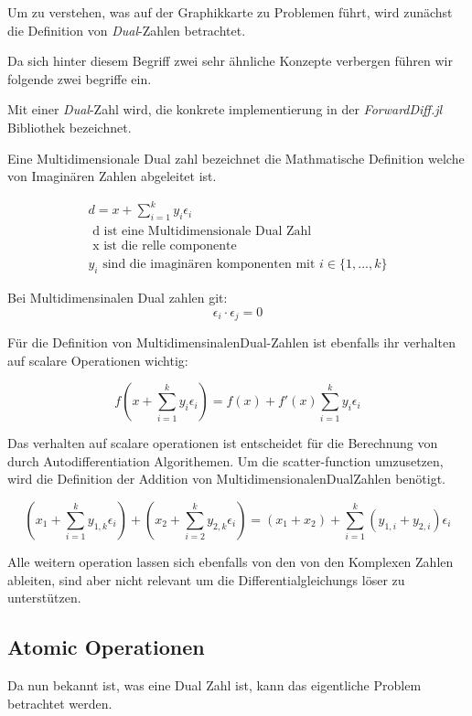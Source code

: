 Um zu verstehen, was auf der Graphikkarte zu Problemen führt, wird zunächst die Definition von \textit{Dual}-Zahlen betrachtet.

Da sich hinter diesem Begriff zwei sehr ähnliche Konzepte verbergen führen wir folgende zwei begriffe ein.

Mit einer \textit{Dual}-Zahl wird, die konkrete implementierung in der \textit{ForwardDiff.jl} Bibliothek bezeichnet.

Eine Multidimensionale Dual zahl bezeichnet die Mathmatische Definition welche von Imaginären Zahlen abgeleitet ist.

\begin{gather*}
 d = x + \sum_{i = 1}^{k} y_i \epsilon_i \\
	\text{ d ist eine Multidimensionale Dual Zahl } \\
	\text{ x ist die relle componente } \\
	y_i \text{ sind die imaginären komponenten mit } i \in \{1, ..., k\}
\end{gather*}

Bei Multidimensinalen Dual zahlen git:
$$
 \epsilon_i \cdot \epsilon_j = 0
$$

Für die Definition von MultidimensinalenDual-Zahlen ist ebenfalls ihr verhalten auf scalare Operationen wichtig:

$$
 f( x + \sum_{i = 1}^{k} y_i \epsilon_i  ) = f(x) +  f'(x) \sum_{i = 1}^{k} y_i \epsilon_i
$$
\cite{juliaForwardDiffPackage}


Das verhalten auf scalare operationen ist entscheidet für die Berechnung von durch Autodifferentiation Algorithemen.
Um die scatter-function umzusetzen, wird die Definition der Addition von MultidimensionalenDualZahlen \cite{RecentAdvances} benötigt.

$$
(x_1 + \sum_{i = 1}^{k} y_{1,k} \epsilon_i) + ( x_2 + \sum_{i = 2}^{k} y_{2,k} \epsilon_i) = (x_1 + x_2) + \sum_{i = 1}^{k} (y_{1, i} + y_{2, i}) \epsilon_i
$$

Alle weitern operation lassen sich ebenfalls von den von den Komplexen Zahlen ableiten, 
sind aber nicht relevant um die Differentialgleichungs löser zu unterstützen.


\subsection{Atomic Operationen} \label{atomic}

Da nun bekannt ist, was eine Dual Zahl ist, 
kann das eigentliche Problem betrachtet werden.

